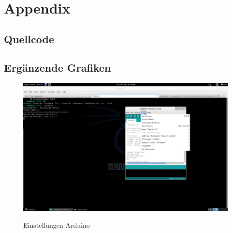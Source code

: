 
\appendix
\chapter{Appendix}
\section{Quellcode}


\lstset{language=C}


\newpage
\section{Ergänzende Grafiken}

\begin{figure}[htbp]

\centering
\includegraphics[width=\textwidth]{bilder/EinstellungenArduino.png}
\label{fig:EinstellungenArduino}
\caption{Einstellungen Arduino}

\end{figure}
